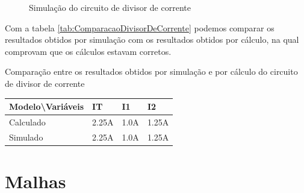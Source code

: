 \begin{figure}[H]
    \centering
    \caption{Simulação do circuito de divisor de corrente}
    \vspace{-0.3cm}
    \label{fig:SimulacaoDivisorDeCorrente}
\end{figure}

Com a tabela \ref{tab:ComparacaoDivisorDeCorrente} podemos comparar os resultados obtidos por simulação com os resultados obtidos por cálculo, na qual comprovam que os cálculos estavam corretos.

\begin{quadro}[H]
    \centering
    \caption{Comparação entre os resultados obtidos por simulação e por cálculo do circuito de divisor de corrente}
    \begin{tabular}{|C{0.34\textwidth}|C{0.19\textwidth}|C{0.19\textwidth}|C{0.19\textwidth}|}
        \hline
        \textbf{Modelo\textbackslash{}Variáveis} & \textbf{IT} & \textbf{I1} & \textbf{I2} \\
        \hline
        Calculado & 2.25A & 1.0A & 1.25A \\
        \hline
        Simulado & 2.25A & 1.0A & 1.25A \\
        \hline
    \end{tabular}
    \vspace{-0.6cm}
    \label{tab:ComparacaoDivisorDeCorrente}
\end{quadro}

\section{Malhas}

